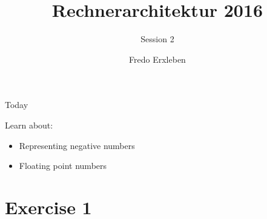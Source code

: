 \documentclass[11pt]{tudbeamer}
\title{Rechnerarchitektur 2016}
\subtitle{Session 2}
\author{Fredo Erxleben}
\begin{document}
  \maketitle

\begin{frame}{Today}

	Learn about:
	\begin{itemize}
		\item Representing negative numbers
		\item Floating point numbers
	\end{itemize}

\end{frame}

\section{Exercise 1}
\end{document}
